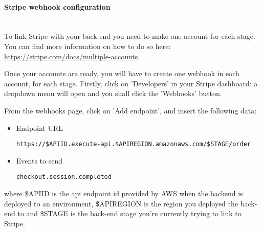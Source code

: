 \paragraph{Stripe webhook configuration}\mbox{}\\
To link Stripe with your back-end you need to make one account for each stage. You can find more information on how to do so here: \url{https://stripe.com/docs/multiple-accounts}.

Once your accounts are ready, you will have to create one webhook in each account, for each stage. Firstly, click on 'Developers' in your Stripe dashboard: a dropdown menu will open and you shall click the 'Webhooks' button.

From the webhooks page, click on 'Add endpoint', and insert the following data:
\begin{itemize}
\item Endpoint URL
\begin{center}
\texttt{https://\$APIID.execute-api.\$APIREGION.amazonaws.com/\$STAGE/order}
\end{center}
\item Events to send
\begin{center}
\texttt{checkout.session.completed}
\end{center}
\end{itemize}
where \$APIID is the api endpoint id provided by AWS when the backend is deployed to an environment, \$APIREGION is the region you deployed the back-end to and \$STAGE is the back-end stage you're currently trying to link to Stripe.